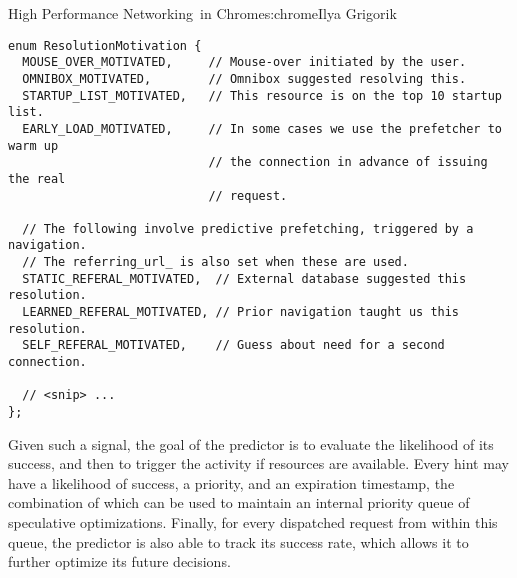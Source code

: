 \begin{aosachapter}{High Performance Networking~in Chrome}{s:chrome}{Ilya Grigorik}
\begin{verbatim}
enum ResolutionMotivation {
  MOUSE_OVER_MOTIVATED,     // Mouse-over initiated by the user.
  OMNIBOX_MOTIVATED,        // Omnibox suggested resolving this.
  STARTUP_LIST_MOTIVATED,   // This resource is on the top 10 startup list.
  EARLY_LOAD_MOTIVATED,     // In some cases we use the prefetcher to warm up
                            // the connection in advance of issuing the real
                            // request.

  // The following involve predictive prefetching, triggered by a navigation.
  // The referring_url_ is also set when these are used.
  STATIC_REFERAL_MOTIVATED,  // External database suggested this resolution.
  LEARNED_REFERAL_MOTIVATED, // Prior navigation taught us this resolution.
  SELF_REFERAL_MOTIVATED,    // Guess about need for a second connection.

  // <snip> ...
};
\end{verbatim}

Given such a signal, the goal of the predictor is to evaluate the
likelihood of its success, and then to trigger the activity if resources
are available. Every hint may have a likelihood of success, a priority,
and an expiration timestamp, the combination of which can be used to
maintain an internal priority queue of speculative optimizations.
Finally, for every dispatched request from within this queue, the
predictor is also able to track its success rate, which allows it to
further optimize its future decisions.


\begin{aosaitemize}


\end{aosaitemize}
\end{aosachapter}
